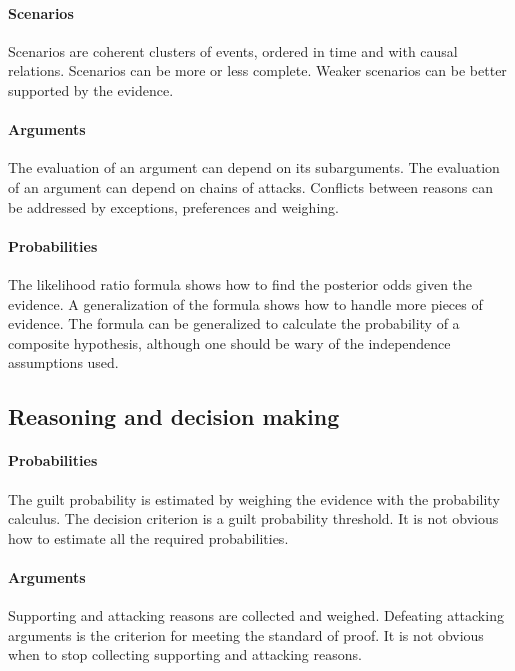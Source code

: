 \documentclass[10pt]{article}
\begin{document}
\paragraph{Scenarios}

Scenarios are coherent clusters 
of events, ordered in time and with causal relations.
Scenarios can be more or less complete.
Weaker scenarios can be better supported by the evidence.
	
\paragraph{Arguments}
The evaluation of an argument can depend on its subarguments.
The evaluation of an argument can depend on chains of attacks.
Conflicts between reasons can be addressed by exceptions, preferences and weighing.
	
\paragraph{Probabilities}

The likelihood ratio formula shows how to find the posterior odds given the evidence.
A generalization of the formula shows how to handle more pieces of evidence.
The formula can be generalized to calculate the probability of a composite hypothesis, although one should be wary 
of the independence assumptions used.

\subsection*{Reasoning and decision making}

\paragraph{Probabilities}

The guilt probability is estimated by weighing the evidence with the probability calculus.
The decision criterion is a guilt probability threshold.
It is not obvious how to estimate all the required probabilities.
	
\paragraph{Arguments}

Supporting and attacking reasons are collected and weighed.
Defeating attacking arguments is the criterion for meeting the standard of proof.
It is not obvious when to stop collecting supporting and attacking reasons.	
	
\end{document}
